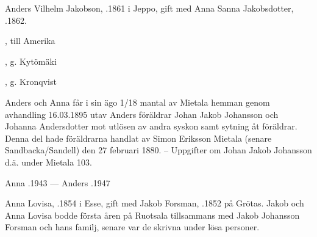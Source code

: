 %
Anders Vilhelm Jakobson, .1861 i Jeppo, gift med Anna Sanna Jakobsdotter, .1862.
\begin{jhchildren}
  \item {}, till Amerika
  \item {}
  \item {}
  \item {}
  \item {}
  \item {}
  \item {}
  \item {}, g. Kytömäki
  \item {}, g. Kronqvist
\end{jhchildren}

Anders och Anna får i sin ägo 1/18 mantal av Mietala hemman genom avhandling 16.03.1895 utav Anders föräldrar Johan Jakob Johansson och Johanna Andersdotter mot utlösen av andra syskon samt sytning åt föräldrar. Denna del hade föräldrarna handlat av Simon Eriksson Mietala (senare Sandbacka/Sandell) den 27 februari 1880. -- Uppgifter om Johan Jakob Johansson d.ä. under Mietala 103.

Anna .1943  ---  Anders .1947



%

%
Anna Lovisa, .1854 i Esse, gift med Jakob Forsman, .1852 på Grötas. Jakob och Anna Lovisa bodde första åren på Ruotsala tillsammans med Jakob Johansson Forsman och hans familj, senare var de skrivna under lösa personer.
\begin{jhchildren}
  \item {}
  \item {}
  \item {}
\end{jhchildren}

